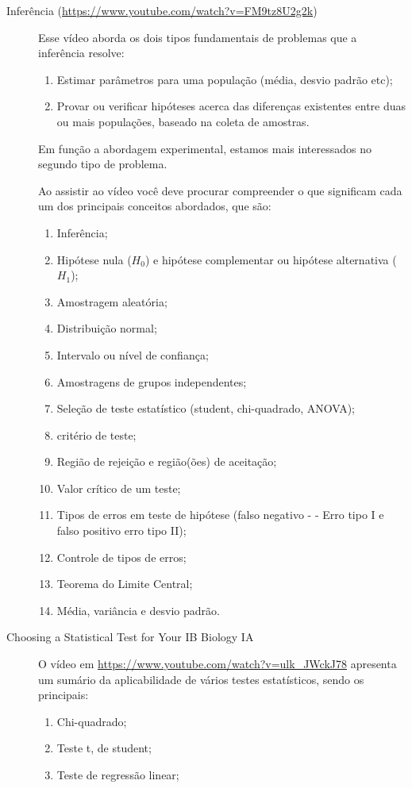 \begin{description}
\item [Inferência (\url{https://www.youtube.com/watch?v=FM9tz8U2g2k})] Esse vídeo aborda os dois tipos fundamentais de problemas que a inferência resolve:
\begin{enumerate}
    \item Estimar parâmetros para uma população (média, desvio padrão etc);
    \item Provar ou verificar hipóteses acerca das diferenças existentes entre duas ou mais populações, baseado na coleta de amostras.
\end{enumerate}
Em função a abordagem experimental, estamos mais interessados no segundo tipo de problema.

Ao assistir ao vídeo você deve procurar compreender o que significam cada um dos principais conceitos abordados, que são: 
\begin{enumerate}
    \item Inferência;
    \item Hipótese nula ($H_0$) e hipótese complementar ou hipótese alternativa ($H_1$);
    \item Amostragem aleatória;
    \item Distribuição normal;
    \item Intervalo ou nível de confiança; 
    \item Amostragens de grupos independentes; 
    \item Seleção de teste estatístico (student, chi-quadrado, ANOVA);
    \item critério de teste;
    \item Região de rejeição e região(ões) de aceitação;
    \item Valor crítico de um teste;
    \item Tipos de erros em teste de hipótese (falso negativo - - Erro tipo I e falso positivo erro tipo II);
    \item Controle de tipos de erros;
    \item Teorema do Limite Central;
    \item Média, variância e desvio padrão.
\end{enumerate}

\item [Choosing a Statistical Test for Your IB Biology IA] O vídeo em \url{https://www.youtube.com/watch?v=ulk_JWckJ78} apresenta um sumário da aplicabilidade de vários testes estatísticos, sendo os principais:
\begin{enumerate}
    \item Chi-quadrado;
    \item Teste t, de student;
    \item Teste de regressão linear;
\end{enumerate}



\end{description}
